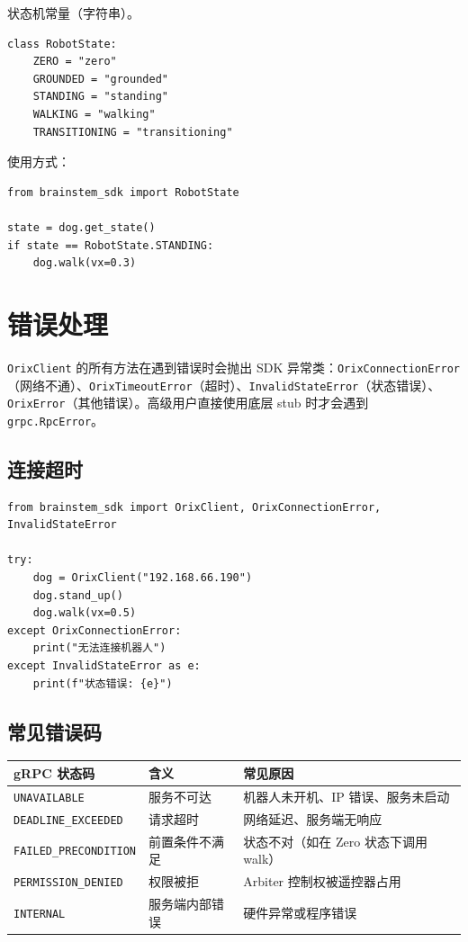 \documentclass[a4paper,11pt,openany]{book}
\begin{document}
状态机常量（字符串）。

\begin{lstlisting}[style=python]
class RobotState:
    ZERO = "zero"
    GROUNDED = "grounded"
    STANDING = "standing"
    WALKING = "walking"
    TRANSITIONING = "transitioning"
\end{lstlisting}

使用方式：

\begin{lstlisting}[style=python]
from brainstem_sdk import RobotState

state = dog.get_state()
if state == RobotState.STANDING:
    dog.walk(vx=0.3)
\end{lstlisting}

\section{错误处理}

\texttt{OrixClient} 的所有方法在遇到错误时会抛出 SDK 异常类：\texttt{OrixConnectionError}（网络不通）、\texttt{OrixTimeoutError}（超时）、\texttt{InvalidStateError}（状态错误）、\texttt{OrixError}（其他错误）。高级用户直接使用底层 stub 时才会遇到 \texttt{grpc.RpcError}。

\subsection{连接超时}

\begin{lstlisting}[style=python]
from brainstem_sdk import OrixClient, OrixConnectionError, InvalidStateError

try:
    dog = OrixClient("192.168.66.190")
    dog.stand_up()
    dog.walk(vx=0.5)
except OrixConnectionError:
    print("无法连接机器人")
except InvalidStateError as e:
    print(f"状态错误: {e}")
\end{lstlisting}

\subsection{常见错误码}

\begin{longtable}{lll}
\toprule
gRPC 状态码 & 含义 & 常见原因 \\
\midrule
\endhead
\texttt{UNAVAILABLE} & 服务不可达 & 机器人未开机、IP 错误、服务未启动 \\
\texttt{DEADLINE\_EXCEEDED} & 请求超时 & 网络延迟、服务端无响应 \\
\texttt{FAILED\_PRECONDITION} & 前置条件不满足 & 状态不对（如在 Zero 状态下调用 walk） \\
\texttt{PERMISSION\_DENIED} & 权限被拒 & Arbiter 控制权被遥控器占用 \\
\texttt{INTERNAL} & 服务端内部错误 & 硬件异常或程序错误 \\
\bottomrule
\end{longtable}
\end{document}
